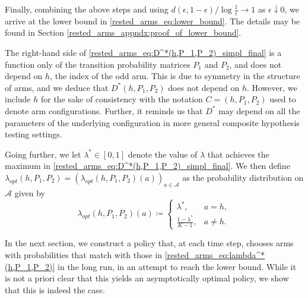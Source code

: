{Finally, combining the above steps and using $d(\epsilon,1-\epsilon)/\log \frac{1}{\epsilon} \to 1$ as $\epsilon\downarrow 0$, we arrive at the lower bound in \eqref{rested_arms_eq:lower_bound}. The details may be found in Section \ref{rested_arms_appndx:proof_of_lower_bound}.}

\begin{remark}
The right-hand side of \eqref{rested_arms_eq:D^*(h,P_1,P_2)_simpl_final} is a function only of the transition probability matrices $P_1$ and $P_2$, and does not depend on $h$, the index of the odd arm. This is due to symmetry in the structure of arms, and we deduce that $D^*(h,P_1,P_2)$ does not depend on $h$. However, we include $h$ for the sake of consistency with the notation $C=(h,P_1,P_2)$ used to denote arm configurations. Further, it reminds us that $D^*$ may depend on all the parameters of the underlying configuration in more general composite hypothesis testing settings.
\end{remark}

 Going further, we let $\lambda^*\in[0,1]$ denote the value of $\lambda$ that achieves the maximum in \eqref{rested_arms_eq:D^*(h,P_1,P_2)_simpl_final}. We then define $\lambda_{opt}(h,P_1,P_2)=(\lambda_{opt}(h,P_1,P_2)(a))_{a\in\mathcal{A}}$ as the probability distribution on $\mathcal{A}$ given by
 \begin{equation}
 	\lambda_{opt}(h,P_1,P_2)(a)\coloneqq\begin{cases}
 		\lambda^*,&a=h,\\
 		\frac{1-\lambda^*}{K-1},&a\neq h.
 	\end{cases}\label{rested_arms_eq:lambda^*(h,P_1,P_2)}
 \end{equation}

 In the next section, we construct a policy that, at each time step, chooses arms with probabilities that match with those in \eqref{rested_arms_eq:lambda^*(h,P_1,P_2)} in the long run, in an attempt to reach the lower bound. While it is not a priori clear that this yields an asymptotically optimal policy, we show that this is indeed the case.




